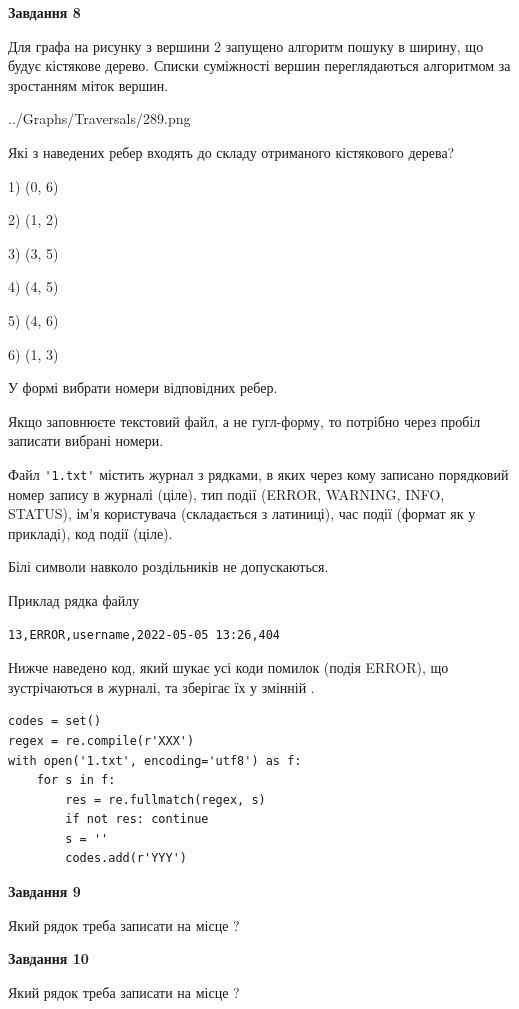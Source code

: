 \documentclass[12pt, ukrainian]{article}
\def\code#1{\Verb!#1!}
\begin{document}
{\begin {large}
{\begin {center}\textbf{Завдання 8}\end {center}}\par
Для графа на рисунку з вершини 2 запущено алгоритм пошуку в ширину, що будує кістякове дерево. Списки суміжності вершин переглядаються алгоритмом за зростанням міток вершин.\par
\begin{center}
	{../Graphs/Traversals/289.png}
\end{center}
\par Які з наведених ребер входять до складу отриманого кістякового дерева?\par
1) (0, 6)\par
2) (1, 2)\par
3) (3, 5)\par
4) (4, 5)\par
5) (4, 6)\par
6) (1, 3)\par
{\vskip 15pt} У формі вибрати номери відповідних ребер.


Якщо заповнюєте текстовий файл, а не гугл-форму, то потрібно через пробіл записа\-ти вибрані номери.\par
\newpage


Файл \code{'1.txt'} містить журнал з рядками, в яких через кому записано поряд\-ко\-вий номер запису в журналі (ціле), тип події (ERROR, WARNING, INFO, STATUS), ім'я користувача (складається з латиниці), час події (фор\-мат як у прикладі), код події (ціле).

Білі символи навколо роздільників не допускаються.

Приклад рядка файлу



\begin{verbatim}
13,ERROR,username,2022-05-05 13:26,404
\end{verbatim}


Нижче наведено код, який шукає усі коди помилок (подія ERROR), що зустріча\-ють\-ся в журналі, та зберігає їх у змінній .



\begin{verbatim}
codes = set()
regex = re.compile(r'XXX')
with open('1.txt', encoding='utf8') as f:
    for s in f:
        res = re.fullmatch(regex, s)
        if not res: continue
        s = ''
        codes.add(r'YYY')
\end{verbatim}


{\begin {center}\textbf{Завдання 9}\end {center}}\par
Який рядок треба записати на місце  ?\par
\vspace{5mm}


{\begin {center}\textbf{Завдання 10}\end {center}}\par
Який рядок треба записати на місце  ?\par


\newpage


\end {large}}
\end{document}
